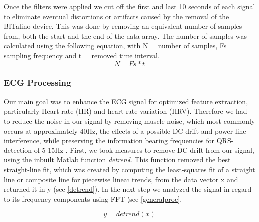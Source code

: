 Once the filters were applied we cut off the first and last 10 seconds of each signal to eliminate eventual distortions or artifacts caused by the removal of the BITalino device. This was done by removing an equivalent number of samples from, both the start and the end of the data array. The number of samples was calculated using the following equation, with N = number of samples, Fs = sampling frequency and t = removed time interval.
%
\begin{equation}\label{NumberSamples}
N = Fs * t
\end{equation} 

\subsubsection{ECG Processing}
Our main goal was to enhance the ECG signal for optimized feature extraction, particularly Heart rate (HR) and heart rate variation (HRV). %
Therefore we had to reduce the noise in our signal by removing muscle noise, which most commonly occurs at approximately 40Hz, the effects of a possible DC drift and power line interference, while preserving the information bearing frequencies for QRS-detection of 5-15Hz \cite{PANTOM1985} \cite{tan2013digital}. First, we took measures to remove DC drift from our signal, using the inbuilt Matlab function \textit{detrend}. This function removed the best straight-line fit, which was created by computing the least-squares fit of a straight line or composite line for piecewise linear trends, from the data vector x and returned it in y (see \ref{detrend}). In the next step we analyzed the signal in regard to its frequency components using FFT (see \ref{generalproc}.

\begin{equation}\label{detrend}
y = detrend(x)
\end{equation}


